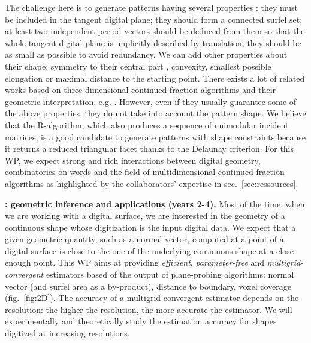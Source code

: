 The challenge here is to generate patterns having several properties \cite{Jamet2016}: 
they must be included in the tangent digital plane;
they should form a connected surfel set;
at least two independent period vectors should be deduced from them so that the whole tangent digital plane is implicitly described by translation;
they should be as small as possible to avoid redundancy.
We can add other properties about their shape: 
symmetry to their central part \cite{Labbe2015}, convexity, smallest possible elongation 
or maximal distance to the starting point. 
There exists a lot of related works based on three-dimensional continued fraction algorithms and their geometric interpretation, e.g. \cite{Fernique2009,Labbe2011,Jamet2016}. However, even if they usually guarantee some of the above properties, they do not take into account the pattern shape. We believe that the R-algorithm, which also produces a sequence of unimodular incident matrices, is a good candidate to generate patterns with shape constraints because it returns a reduced triangular facet thanks to the Delaunay criterion. For this WP, we expect strong and rich interactions between digital geometry, combinatorics on words and the field of multidimensional continued fraction algorithms as highlighted by the collaborators' expertise in sec.~\ref{sec:ressources}.


\noindent\textbf{\wpEstim: geometric inference and applications (years 2-4).} Most of the time, when we are working with a digital surface, we are 
interested in the geometry of a continuous shape whose digitization is the input digital data.
We expect that a given geometric quantity, such as a normal vector, computed at a point of a digital surface is close to the one of the underlying continuous shape at a close enough point. 
This WP aims at providing \emph{efficient}, \emph{parameter-free} and \emph{multigrid-convergent} estimators based of the output of plane-probing algorithms: normal vector (and surfel area as a by-product), distance to boundary, voxel coverage (fig.~\ref{fig:2D}). The accuracy of a multigrid-convergent estimator depends on the resolution: the higher the resolution, the more accurate the estimator. We will experimentally and theoretically study the estimation accuracy for shapes digitized at increasing resolutions. 

